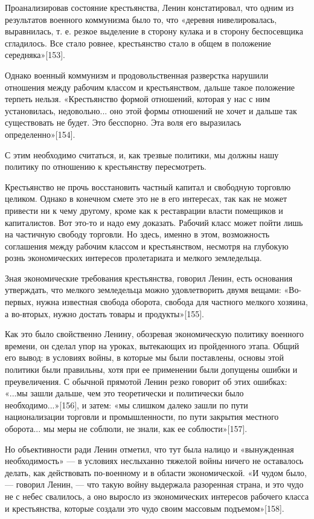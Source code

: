 \documentclass[12pt, a4paper, openany]{book}
\begin{document}
Проанализировав состояние крестьянства, Ленин констатировал, что одним из результатов военного коммунизма было то, что «деревня нивелировалась, выравнилась, т. е. резкое выделение в сторону кулака и в сторону беспосевщика сгладилось. Все стало ровнее, крестьянство стало в общем в положение середняка»[153].

Однако военный коммунизм и продовольственная разверстка нарушили отношения между рабочим классом и крестьянством, дальше такое положение терпеть нельзя. «Крестьянство формой отношений, которая у нас с ним установилась, недовольно... оно этой формы отношений не хочет и дальше так существовать не будет. Это бесспорно. Эта воля его выразилась определенно»[154].

С этим необходимо считаться, и, как трезвые политики, мы должны нашу политику по отношению к крестьянству пересмотреть.

Крестьянство не прочь восстановить частный капитал и свободную торговлю целиком. Однако в конечном смете это не в его интересах, так как не может привести ни к чему другому, кроме как к реставрации власти помещиков и капиталистов. Вот это-то и надо ему доказать. Рабочий класс может пойти лишь на частичную свободу торговли. Но здесь, именно в этом, возможность соглашения между рабочим классом и крестьянством, несмотря на глубокую рознь экономических интересов пролетариата и мелкого земледельца.

Зная экономические требования крестьянства, говорил Ленин, есть основания утверждать, что мелкого земледельца можно удовлетворить двумя вещами: «Во-первых, нужна известная свобода оборота, свобода для частного мелкого хозяина, а во-вторых, нужно достать товары и продукты»[155].

Как это было свойственно Ленину, обозревая экономическую политику военного времени, он сделал упор на уроках, вытекающих из пройденного этапа. Общий его вывод: в условиях войны, в которые мы были поставлены, основы этой политики были правильны, хотя при ее применении были допущены ошибки и преувеличения. С обычной прямотой Ленин резко говорит об этих ошибках: «...мы зашли дальше, чем это теоретически и политически было необходимо...»[156], и затем: «мы слишком далеко зашли по пути национализации торговли и промышленности, по пути закрытия местного оборота... мы меры не соблюли, не знали, как ее соблюсти»[157].

Но объективности ради Ленин отметил, что тут была налицо и «вынужденная необходимость» — в условиях неслыханно тяжелой войны ничего не оставалось делать, как действовать по-военному и в области экономической. «И чудом было, — говорил Ленин, — что такую войну выдержала разоренная страна, и это чудо не с небес свалилось, а оно выросло из экономических интересов рабочего класса и крестьянства, которые создали это чудо своим массовым подъемом»[158].
\end{document}
